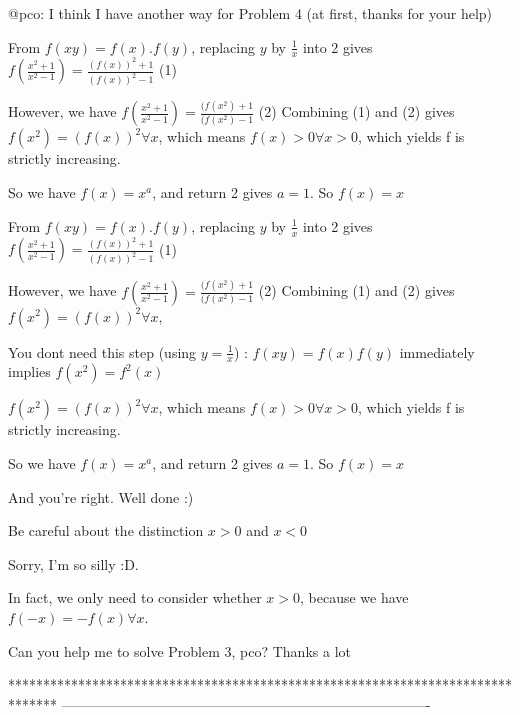 \begin{solution}
	@pco: I think I have another way for Problem 4 (at first, thanks for your help)

From $ f(xy) = f(x).f(y)$, replacing $ y$ by $ \frac{1}{x}$ into 2\/ gives
$ f(\frac{x^2 + 1}{x^2 - 1}) = \frac{(f(x))^2 + 1}{(f(x))^2 - 1}$ (1)

However, we have $ f(\frac{x^2 + 1}{x^2 - 1}) = \frac{(f(x^2) + 1}{(f(x^2) - 1}$ (2)
Combining (1) and (2) gives $ f(x^2) = (f(x))^2 \forall x$, which means $ f(x) > 0 \forall x > 0$, which yields f is strictly increasing.

So we have $ f(x) = x^a$, and return 2\/ gives $ a = 1$. So $ f(x) = x$
\end{solution}



\begin{solution}
	\begin{tcolorbox} From $ f(xy) = f(x).f(y)$, replacing $ y$ by $ \frac {1}{x}$ into 2\/ gives
$ f(\frac {x^2 + 1}{x^2 - 1}) = \frac {(f(x))^2 + 1}{(f(x))^2 - 1}$ (1)

However, we have $ f(\frac {x^2 + 1}{x^2 - 1}) = \frac {(f(x^2) + 1}{(f(x^2) - 1}$ (2)
Combining (1) and (2) gives $ f(x^2) = (f(x))^2 \forall x$, \end{tcolorbox}

You dont need this step (using $ y=\frac{1}{x}$) : $ f(xy)=f(x)f(y)$ immediately implies $ f(x^2)=f^2(x)$

\begin{tcolorbox} $ f(x^2) = (f(x))^2 \forall x$, which means $ f(x) > 0 \forall x > 0$, which yields f is strictly increasing.

So we have $ f(x) = x^a$, and return 2\/ gives $ a = 1$. So $ f(x) = x$ \end{tcolorbox}

And you're right. Well done :)

Be careful about the distinction $ x>0$ and $ x<0$
\end{solution}



\begin{solution}
	Sorry, I'm so silly :D.

In fact, we only need to consider whether $ x > 0$, because we have $ f(-x) = -f(x) \forall x$.

Can you help me to solve Problem 3, pco? Thanks a lot
\end{solution}
*******************************************************************************
-------------------------------------------------------------------------------

